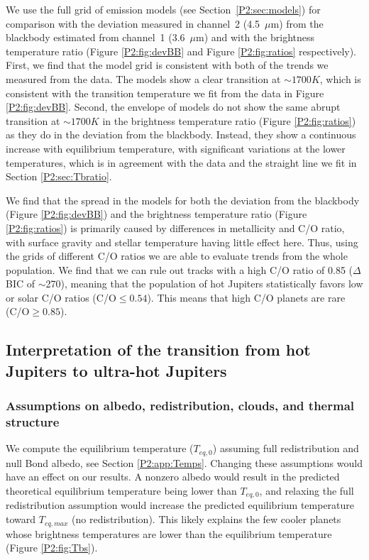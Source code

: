 We use the full grid of emission models (see Section~\ref{P2:sec:models}) for comparison with the deviation measured in channel~2 (4.5~$\mu$m) from the blackbody estimated from channel~1 (3.6~$\mu$m) and with the brightness temperature ratio (Figure \ref{P2:fig:devBB} and Figure \ref{P2:fig:ratios} respectively). First, we find that the model grid is consistent with both of the trends we measured from the data. The models show a clear transition at $\sim1700K$, which is consistent with the transition temperature we fit from the data in Figure \ref{P2:fig:devBB}. Second, the envelope of models do not show the same abrupt transition at $\sim1700K$ in the brightness temperature ratio (Figure \ref{P2:fig:ratios}) as they do in the deviation from the blackbody. Instead, they show a continuous increase with equilibrium temperature, with significant variations at the lower temperatures, which is in agreement with the data and the straight line we fit in Section \ref{P2:sec:Tbratio}.

We find that the spread in the models for both the deviation from the blackbody (Figure \ref{P2:fig:devBB}) and the brightness temperature ratio (Figure \ref{P2:fig:ratios}) is primarily caused by differences in metallicity and C/O ratio, with surface gravity and stellar temperature having little effect here. Thus, using the grids of different C/O ratios we are able to evaluate trends from the whole population. We find that we can rule out tracks with a high C/O ratio of 0.85 ($\Delta$BIC of $\sim$270), meaning that the population of hot Jupiters statistically favors low or solar C/O ratios (C/O$\leq0.54$). This means that high C/O planets are rare (C/O$\geq0.85$).

\subsection{Interpretation of the transition from hot Jupiters to ultra-hot Jupiters}

\subsubsection{Assumptions on albedo, redistribution, clouds, and thermal structure}
\label{P2:sec:albedoredist}

We compute the equilibrium temperature ($T_{eq,\textit{0}}$) assuming full redistribution and null Bond albedo, see Section \ref{P2:app:Temps}. Changing these assumptions would have an effect on our results. A nonzero albedo would result in the predicted theoretical equilibrium temperature being lower than $T_{eq,\textit{0}}$, and relaxing the full redistribution assumption would increase the predicted equilibrium temperature toward $T_{eq,max}$ (no redistribution).
This likely explains the few cooler planets whose brightness temperatures are lower than the equilibrium temperature (Figure \ref{P2:fig:Tbs}).

